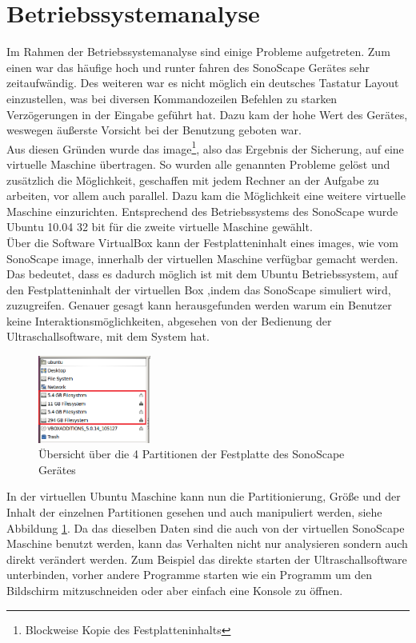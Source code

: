\section{Betriebssystemanalyse}

Im Rahmen der Betriebssystemanalyse sind einige Probleme aufgetreten. Zum einen war das häufige hoch und runter fahren des SonoScape Gerätes sehr zeitaufwändig. Des weiteren war es nicht möglich ein deutsches Tastatur Layout einzustellen, was bei diversen Kommandozeilen Befehlen zu starken Verzögerungen in der Eingabe geführt hat. Dazu kam der hohe Wert des Gerätes, weswegen äußerste Vorsicht bei der Benutzung geboten war.\\
Aus diesen Gründen wurde das image\footnote{Blockweise Kopie des Festplatteninhalts}, also das Ergebnis der Sicherung, auf eine virtuelle Maschine übertragen. So wurden alle genannten Probleme gelöst und zusätzlich die Möglichkeit, geschaffen mit jedem Rechner an der Aufgabe zu arbeiten, vor allem auch parallel. Dazu kam die Möglichkeit eine weitere virtuelle Maschine einzurichten. Entsprechend des Betriebssystems des SonoScape wurde Ubuntu 10.04 32 bit für die zweite virtuelle Maschine gewählt.\\
Über die Software VirtualBox kann der Festplatteninhalt eines images, wie vom SonoScape image, innerhalb der virtuellen Maschine verfügbar gemacht werden. Das bedeutet, dass es dadurch möglich ist mit dem Ubuntu Betriebssystem, auf den Festplatteninhalt der virtuellen Box ,indem das SonoScape simuliert wird, zuzugreifen. Genauer gesagt kann herausgefunden werden warum ein Benutzer keine Interaktionsmöglichkeiten, abgesehen von der Bedienung der Ultraschallsoftware, mit dem System hat.\\
\begin{figure}
\centering
\includegraphics*[width =0.33\textwidth]{Sonoscape_Analyse/Anzahl_Festplatten}
\caption{{\small Übersicht über die 4 Partitionen der Festplatte des SonoScape Gerätes}}
\label{fig:Festplatte}
\end{figure}
In der virtuellen Ubuntu Maschine kann nun die Partitionierung, Größe und der Inhalt der einzelnen Partitionen gesehen und auch manipuliert werden, siehe Abbildung \ref{fig:Festplatte}. Da das dieselben Daten sind die auch von der virtuellen SonoScape Maschine benutzt werden, kann das Verhalten nicht nur analysieren sondern auch direkt verändert werden.
Zum Beispiel das direkte starten der Ultraschallsoftware unterbinden, vorher andere Programme starten wie ein Programm um den Bildschirm mitzuschneiden oder aber einfach eine Konsole zu öffnen.
